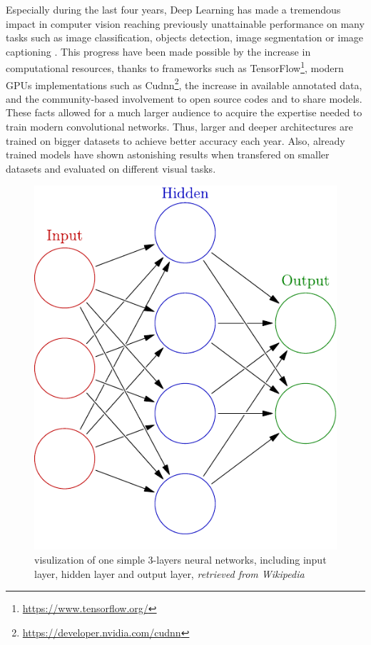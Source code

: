     Especially during the last four years, Deep Learning has made a tremendous impact in computer vision reaching previously unattainable performance on many tasks such as image classification, objects detection, image segmentation or image captioning \cite{DBLP:journals/corr/GuWKMSSLWW15}. This progress have been made possible by the increase in computational resources, thanks to frameworks such as TensorFlow\footnote{\url{https://www.tensorflow.org/}}, modern GPUs implementations such as Cudnn\footnote{\url{https://developer.nvidia.com/cudnn}}, the increase in available annotated data, and the community-based involvement to open source codes and to share models. These facts allowed for a much larger audience to acquire the expertise needed to train modern convolutional networks. Thus, larger and deeper architectures are trained on bigger datasets to achieve better accuracy each year. Also, already trained models have shown astonishing results when transfered on smaller datasets and evaluated on different visual tasks. 
    \begin{figure}[!ht]
        \centering
        \includegraphics[scale = 0.5]{Figures/Colored_neural_network}
        \caption{visulization of one simple $3$-layers neural networks, including input layer, hidden layer and output layer, \textit{retrieved from Wikipedia}}
    \end{figure}

